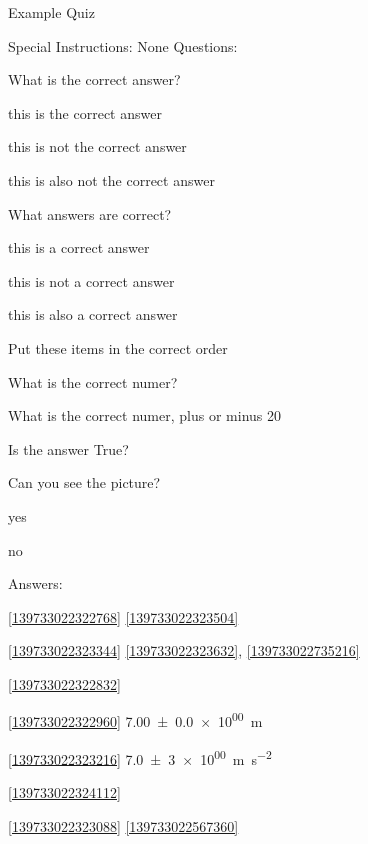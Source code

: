 \documentclass[letterpaper,10pt]{article}
\begin{document}
\begin{center}
{\Large Example Quiz}
\end{center}

Special Instructions:
None
\vspace{10pt}
Questions:
\vspace{10pt}

\begin{compactenum}
\item \label{139733022322768}What is the correct answer?
\begin{compactenum}
\item \label{139733022323504}this is the correct answer
\item \label{139733022734784}this is not the correct answer
\item \label{139733022734856}this is also not the correct answer
\end{compactenum}
\item \label{139733022323344}What answers are correct?
\begin{compactenum}
\item \label{139733022323632}this is a correct answer
\item \label{139733022734928}this is not a correct answer
\item \label{139733022735216}this is also a correct answer
\end{compactenum}
\item \label{139733022322832}Put these items in the correct order

\item \label{139733022322960}What is the correct numer?

\item \label{139733022323216}What is the correct numer, plus or minus 20%

\item \label{139733022324112}Is the answer True?

\item \label{139733022323088}Can you see the picture?
\begin{compactenum}
\item \label{139733022567360}yes
\item \label{139733022679248}no
\end{compactenum}
\end{compactenum}

\clearpage
Answers:

\ref{139733022322768} \ref{139733022323504}

\ref{139733022323344} \ref{139733022323632}, \ref{139733022735216}

\ref{139733022322832} 

\ref{139733022322960} \SI[separate-uncertainty=true]{7.00(0)e+00}{\meter}

\ref{139733022323216} \SI[separate-uncertainty=true]{7.0(30)e+00}{\meter\per\second\squared}

\ref{139733022324112} 

\ref{139733022323088} \ref{139733022567360}
\end{document}
